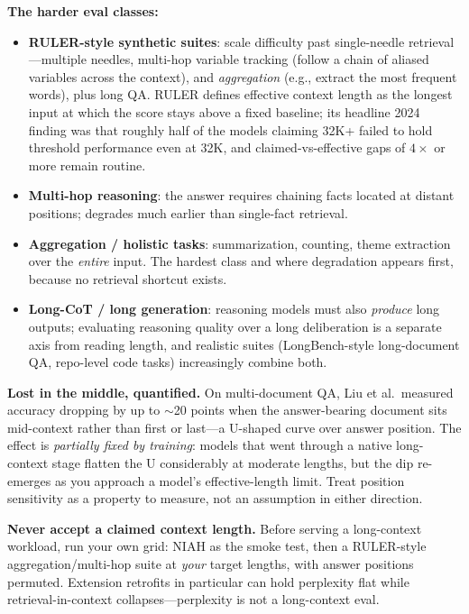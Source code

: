 \textbf{The harder eval classes:}
\begin{itemize}
    \item \textbf{RULER-style synthetic suites}: scale difficulty past single-needle retrieval---multiple needles, multi-hop variable tracking (follow a chain of aliased variables across the context), and \textit{aggregation} (e.g., extract the most frequent words), plus long QA. RULER defines effective context length as the longest input at which the score stays above a fixed baseline; its headline 2024 finding was that roughly half of the models claiming 32K+ failed to hold threshold performance even at 32K, and claimed-vs-effective gaps of $4\times$ or more remain routine.
    \item \textbf{Multi-hop reasoning}: the answer requires chaining facts located at distant positions; degrades much earlier than single-fact retrieval.
    \item \textbf{Aggregation / holistic tasks}: summarization, counting, theme extraction over the \textit{entire} input. The hardest class and where degradation appears first, because no retrieval shortcut exists.
    \item \textbf{Long-CoT / long generation}: reasoning models must also \textit{produce} long outputs; evaluating reasoning quality over a long deliberation is a separate axis from reading length, and realistic suites (LongBench-style long-document QA, repo-level code tasks) increasingly combine both.
\end{itemize}

\textbf{Lost in the middle, quantified.} On multi-document QA, Liu et al.\ measured accuracy dropping by up to $\sim$20 points when the answer-bearing document sits mid-context rather than first or last---a U-shaped curve over answer position. The effect is \textit{partially fixed by training}: models that went through a native long-context stage flatten the U considerably at moderate lengths, but the dip re-emerges as you approach a model's effective-length limit. Treat position sensitivity as a property to measure, not an assumption in either direction.

\begin{warningbox}
\textbf{Never accept a claimed context length.} Before serving a long-context workload, run your own grid: NIAH as the smoke test, then a RULER-style aggregation/multi-hop suite at \textit{your} target lengths, with answer positions permuted. Extension retrofits in particular can hold perplexity flat while retrieval-in-context collapses---perplexity is not a long-context eval.
\end{warningbox}

